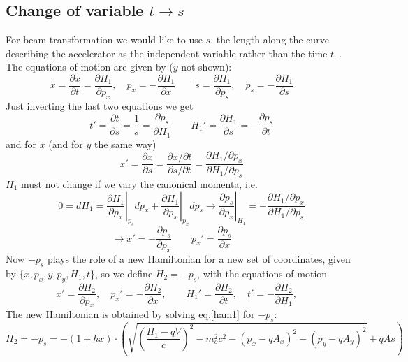 \documentclass[12pt]{article}
\newcommand{\see}{\mbox{$\rightarrow$}}
\newcommand\beq{\begin{equation}}
\newcommand\eeq{\end{equation}}
\begin{document}
\subsection{Change of variable $t\rightarrow s$}
For beam transformation we would like to use $s$, the length along the curve describing
the accelerator as the independent variable rather than the time $t$~\cite{es}.
The equations of motion are given by ($y$ not shown):
\[
\dot{x}=\frac{\partial x}{\partial t}=\frac{\partial H_1}{\partial p_x},\quad
\dot{p_x}=-\frac{\partial H_1}{\partial x}\qquad
\dot{s}=\frac{\partial H_1}{\partial p_s},\quad
\dot{p_s}=-\frac{\partial H_1}{\partial s}\qquad
\]
Just inverting the last two equations we get
\[
t'=\frac{\partial t}{\partial s}=\frac{1}{\dot{s}}=\frac{\partial p_s}{\partial H_1}\qquad
H_1'=\frac{\partial H_1}{\partial s}=-\frac{\partial p_s}{\partial t}
\]
and for $x$ (and for $y$ the same way)
\[
x'=\frac{\partial x}{\partial s}=\frac{\partial x/\partial t}{\partial s/\partial t}=
\frac{\partial H_1/\partial p_x}{\partial H_1/\partial p_s}
\]
$H_1$ must not change if we vary the canonical momenta, i.e.
\[
0=dH_1 = \left. \frac{\partial H_1}{\partial p_x}\right|_{p_s}dp_x
+\left. \frac{\partial H_1}{\partial p_s}\right|_{p_x}dp_s \see
 \left. \frac{\partial p_s}{\partial p_x}\right|_{H_1} =
-\frac{\partial H_1/\partial p_x}{\partial H_1/\partial p_s}
\]
\beq
\see x'= - \frac{\partial p_s}{\partial p_x}\qquad
p_x'=  \frac{\partial p_s}{\partial x}\qquad
\eeq
Now $-p_s$ plays the role of a new Hamiltonian for a new set of coordinates, given by
$\{x,p_x,y,p_y,H_1, t\}$, so we define $H_2=-p_s$, with the equations of motion
\beq
x'= \frac{\partial H_2}{\partial p_x},\quad
p_x'= -\frac{\partial H_2}{\partial x},\qquad
H_1'=\frac{\partial H_2}{\partial t},\quad
t'=-\frac{\partial H_2}{\partial H_1},\quad
\eeq
The new Hamiltonian is obtained by solving eq.\ref{ham1} for $-p_s$:
\beq\label{ham2}
H_2=-p_s=-(1+hx)\cdot\left(
\sqrt{
\left( \frac{H_1-qV}{c}\right)^2 - m_o^2c^2-(p_x-qA_x)^2 -(p_y-qA_y)^2
} + qAs \right)
\eeq
\end{document}

